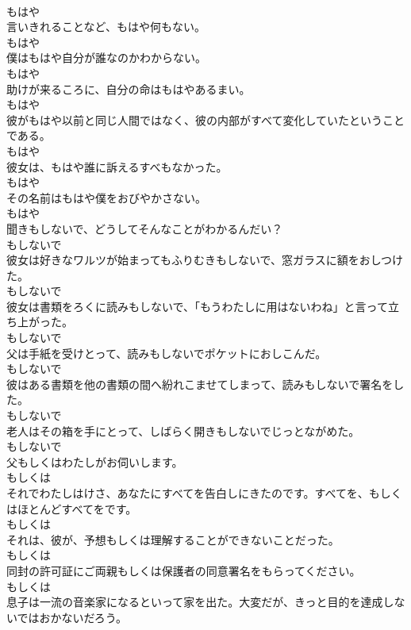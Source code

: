\documentclass[8pt]{extreport}
\begin{document}
\begin{CJK}{UTF8}{min}
\\	もはや	
\\	言いきれることなど、もはや何もない。	
\\	もはや	
\\	僕はもはや自分が誰なのかわからない。	
\\	もはや	
\\	助けが来るころに、自分の命はもはやあるまい。	
\\	もはや	
\\	彼がもはや以前と同じ人間ではなく、彼の内部がすべて変化していたということである。	
\\	もはや	
\\	彼女は、もはや誰に訴えるすべもなかった。	
\\	もはや	
\\	その名前はもはや僕をおびやかさない。	
\\	もはや	
\\	聞きもしないで、どうしてそんなことがわかるんだい？	
\\	もしないで	
\\	彼女は好きなワルツが始まってもふりむきもしないで、窓ガラスに額をおしつけた。	
\\	もしないで	
\\	彼女は書類をろくに読みもしないで、「もうわたしに用はないわね」と言って立ち上がった。	
\\	もしないで	
\\	父は手紙を受けとって、読みもしないでポケットにおしこんだ。	
\\	もしないで	
\\	彼はある書類を他の書類の間へ紛れこませてしまって、読みもしないで署名をした。	
\\	もしないで	
\\	老人はその箱を手にとって、しばらく開きもしないでじっとながめた。	
\\	もしないで	
\\	父もしくはわたしがお伺いします。	
\\	もしくは	
\\	それでわたしはけさ、あなたにすべてを告白しにきたのです。すべてを、もしくはほとんどすべてをです。	
\\	もしくは	
\\	それは、彼が、予想もしくは理解することができないことだった。	
\\	もしくは	
\\	同封の許可証にご両親もしくは保護者の同意署名をもらってください。	
\\	もしくは	
\\	息子は一流の音楽家になるといって家を出た。大変だが、きっと目的を達成しないではおかないだろう。	

\end{CJK}
\end{document}
